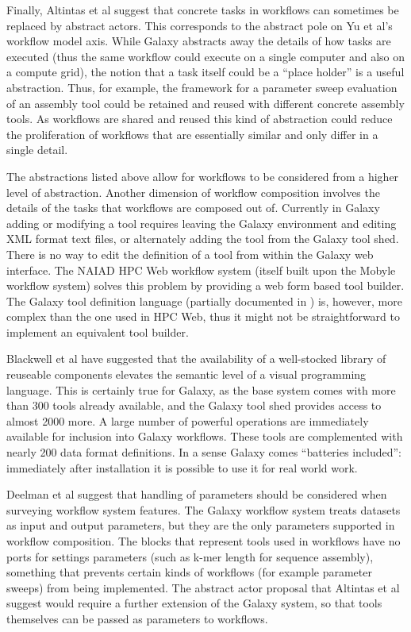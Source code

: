 \documentclass[a4paper,10pt]{scrreprt}
\begin{document}
Finally, Altintas et al suggest that concrete tasks in workflows can sometimes be replaced by abstract actors. This corresponds to the abstract pole on Yu et al's workflow model axis. While Galaxy abstracts away the details of how tasks are executed (thus the same workflow could execute on a single computer and also on a compute grid), the notion that a task itself could be a ``place holder'' is a useful abstraction. Thus, for example, the framework for a parameter sweep evaluation of an assembly tool could be retained and reused with different concrete assembly tools. As workflows are shared and reused this kind of abstraction could reduce the proliferation of workflows that are essentially similar and only differ in a single detail.

The abstractions listed above allow for workflows to be considered from a higher level of abstraction. Another dimension of workflow composition involves the details of the tasks that workflows are composed out of. Currently in Galaxy adding or modifying a tool requires leaving the Galaxy environment and editing XML format text files, or alternately adding the tool from the Galaxy tool shed. There is no way to edit the definition of a tool from within the Galaxy web interface. The NAIAD HPC Web workflow system \cite{tartakovsky_cyber_2011} (itself built upon the Mobyle \cite{neron_mobyle:_2009} workflow system) solves this problem by providing a web form based tool builder. The Galaxy tool definition language (partially documented in \cite{the_galaxy_team_galaxy_2011}) is, however, more complex than the one used in HPC Web, thus it might not be straightforward to implement an equivalent tool builder.

Blackwell et al have suggested that the availability of a well-stocked library of reuseable components elevates the semantic level of a visual programming language. This is certainly true for Galaxy, as the base system comes with more than 300 tools already available, and the Galaxy tool shed provides access to almost 2000 more. A large number of powerful operations are immediately available for inclusion into Galaxy workflows. These tools are complemented with nearly 200 data format definitions. In a sense Galaxy comes ``batteries included'': immediately after installation it is possible to use it for real world work.

Deelman et al suggest that handling of parameters should be considered when surveying workflow system features. The Galaxy workflow system treats datasets as input and output parameters, but they are the only parameters supported in workflow composition. The blocks that represent tools used in workflows have no ports for settings parameters (such as k-mer length for sequence assembly), something that prevents certain kinds of workflows (for example parameter sweeps) from being implemented. The abstract actor proposal that Altintas et al suggest would require a further extension of the Galaxy system, so that tools themselves can be passed as parameters to workflows.
\end{document}

